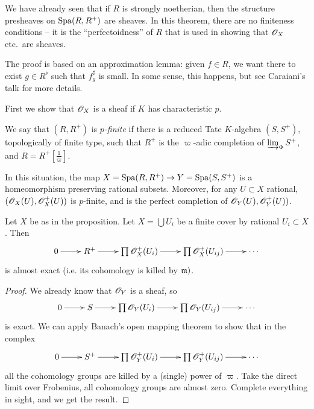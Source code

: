 \documentclass{article}
\begin{document}
We have already seen that if $R$ is strongly noetherian, then the structure 
presheaves on $\operatorname{Spa}(R,R^+)$ are sheaves. In this theorem, there are no finiteness 
conditions -- it is the ``perfectoidness'' of $R$ that is used in showing that 
$\mathscr{O}_X$ etc.\ are sheaves. 

The proof is based on an approximation lemma: given $f\in R$, we want there to 
exist $g\in R^\flat$ such that $f_g^\sharp$ is small. In some sense, this happens, 
but see Caraiani's talk for more details. 

First we show that $\mathscr{O}_X$ is a sheaf if $K$ has characteristic $p$. 

\begin{definition}
We say 
that $(R,R^+)$ is \emph{$p$-finite} if there is a reduced Tate $K$-algebra 
$(S,S^+)$, topologically of finite type, such that $R^+$ is the $\varpi$-adic 
completion of $\varinjlim_\Phi S^+$, and $R=R^+[\frac 1 \varpi]$. 
\end{definition}

\begin{proposition}
In this situation, the map $X=\operatorname{Spa}(R,R^+) \to Y=\operatorname{Spa}(S,S^+)$ is a 
homeomorphism preserving rational subsets. Moreover, for any $U\subset X$ rational, 
$(\mathscr{O}_X(U),\mathscr{O}_X^+(U))$ is $p$-finite, and is the perfect completion of 
$\mathscr{O}_Y(U),\mathscr{O}_Y^+(U))$. 
\end{proposition}


\begin{corollary}
Let $X$ be as in the proposition. Let $X=\bigcup U_i$ be a finite cover by 
rational $U_i\subset X$. Then 
\[\xymatrix{
  0 \ar[r] 
    & R^+ \ar[r] 
    & \prod \sO_X^+(U_i) \ar[r] 
    & \prod \sO_X^+(U_{i j}) \ar[r] 
    & \cdots 
}\]
is almost exact (i.e. its cohomology is killed by $\mathfrak{m})$. 
\end{corollary}
\begin{proof}
We already know that $\mathscr{O}_Y$ is a sheaf, so 
\[\xymatrix{
  0 \ar[r] 
    & S \ar[r] 
    & \prod \sO_Y(U_i) \ar[r] 
    & \prod \sO_Y(U_{i j}) \ar[r] 
    & \cdots
}\]
is exact. We can apply Banach's open mapping theorem to show that in the complex 
\[\xymatrix{
  0 \ar[r] 
    & S^+ \ar[r] 
    & \prod \sO_Y^+(U_i) \ar[r] 
    & \prod \sO_Y^+(U_{i j}) \ar[r] 
    & \cdots 
}\]
all the cohomology groups are killed by a (single) power of $\varpi$. Take the 
direct limit over Frobenius, all cohomology groups are almost zero. Complete 
everything in sight, and we get the result. 
\end{proof}
\end{document}
